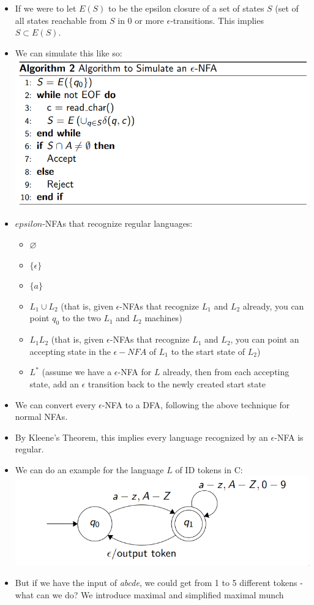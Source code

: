 \documentclass[12pt]{article}
\begin{document}
\begin{itemize}
    \item If we were to let $E(S)$ to be the epsilon closure of a set of states $S$ (set of all states reachable from $S$ in 0 or more $\epsilon$-transitions.  This implies $S \subset E(S)$.
    \item We can simulate this like so: \\
        \includegraphics[scale=0.5]{e_nfa_sim.png}
    \item $epsilon$-NFAs that recognize regular languages:
        \begin{itemize}
            \item $\varnothing$
            \item $\{\epsilon \}$
            \item $\{a\}$
            \item $L_1 \cup L_2$ (that is, given $\epsilon$-NFAs that recognize $L_1$ and $L_2$ already, you can point $q_0$ to the two $L_1$ and $L_2$ machines)
            \item $L_1L_2$ (that is, given $\epsilon$-NFAs that recognize $L_1$ and $L_2$, you can point an accepting state in the $\epsilon-NFA$ of $L_1$ to the start state of $L_2$)
            \item $L^*$ (assume we have a $\epsilon$-NFA for $L$ already, then from each accepting state, add an $\epsilon$ transition back to the newly created start state
        \end{itemize}
    \item We can convert every $\epsilon$-NFA to a DFA, following the above technique for normal NFAs.
    \item By Kleene's Theorem, this implies every language recognized by an $\epsilon$-NFA is regular.
    \item We can do an example for the language $L$ of ID tokens in C: \\
        \includegraphics[scale=0.5]{c_id.png}
    \item But if we have the input of \emph{abcde}, we could get from 1 to 5 different tokens - what can we do?  We introduce maximal and simplified maximal munch
\end{itemize}
\end{document}
